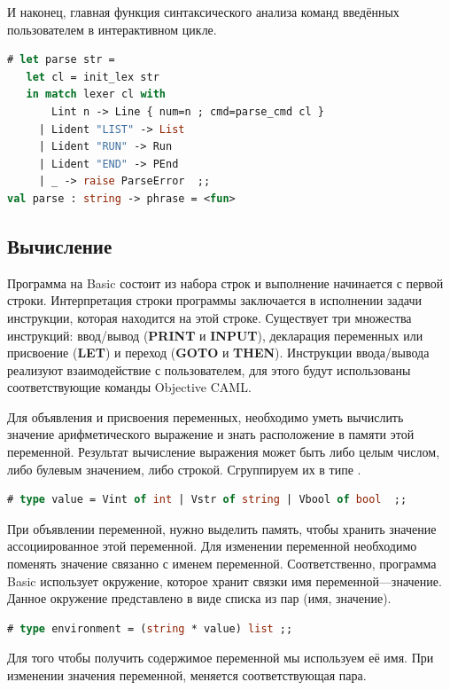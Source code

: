 И наконец, главная функция синтаксического анализа команд введённых 
пользователем в интерактивном цикле.

\begin{lstlisting}[language=OCaml]
# let parse str = 
   let cl = init_lex str 
   in match lexer cl with 
       Lint n -> Line { num=n ; cmd=parse_cmd cl }
     | Lident "LIST" -> List 
     | Lident "RUN" -> Run 
     | Lident "END" -> PEnd 
     | _ -> raise ParseError  ;;
val parse : string -> phrase = <fun>
\end{lstlisting}

\subsection{Вычисление}
\label{subsec:evaluation}

Программа на Basic состоит из набора строк и выполнение начинается с первой 
строки. Интерпретация строки программы заключается в исполнении задачи 
инструкции, которая находится на этой строке. Существует три множества 
инструкций: ввод/вывод ({\bf PRINT} и {\bf INPUT}), декларация переменных или 
присвоение ({\bf LET}) и переход ({\bf GOTO} и {\bf THEN}). Инструкции 
ввода/вывода реализуют взаимодействие с пользователем, для этого будут 
использованы соответствующие команды Objective CAML.

Для объявления и присвоения переменных, необходимо уметь вычислить значение 
арифметического выражение и знать расположение в памяти этой переменной. 
Результат вычисление выражения может быть либо целым числом, либо булевым 
значением, либо строкой. Сгруппируем их в типе .

\begin{lstlisting}[language=OCaml]
# type value = Vint of int | Vstr of string | Vbool of bool  ;;
\end{lstlisting}

При объявлении переменной, нужно выделить память, чтобы хранить значение 
ассоциированное этой переменной. Для изменении переменной необходимо поменять 
значение связанно с именем переменной. Соответственно, программа Basic 
использует окружение, которое хранит связки имя переменной---значение. Данное 
окружение представлено в виде списка из пар (имя, значение).

\begin{lstlisting}[language=OCaml]
# type environment = (string * value) list ;;
\end{lstlisting}

Для того чтобы получить содержимое переменной мы используем её имя. При 
изменении значения переменной, меняется соответствующая пара.

